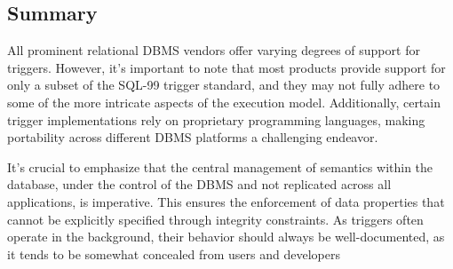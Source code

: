 \subsection{Summary}
All prominent relational DBMS vendors offer varying degrees of support for triggers. 
However, it's important to note that most products provide support for only a subset of the SQL-99 trigger standard, and they may not fully adhere to some of the more intricate aspects of the execution model. 
Additionally, certain trigger implementations rely on proprietary programming languages, making portability across different DBMS platforms a challenging endeavor.

It's crucial to emphasize that the central management of semantics within the database, under the control of the DBMS and not replicated across all applications, is imperative. 
This ensures the enforcement of data properties that cannot be explicitly specified through integrity constraints. 
As triggers often operate in the background, their behavior should always be well-documented, as it tends to be somewhat concealed from users and developers
